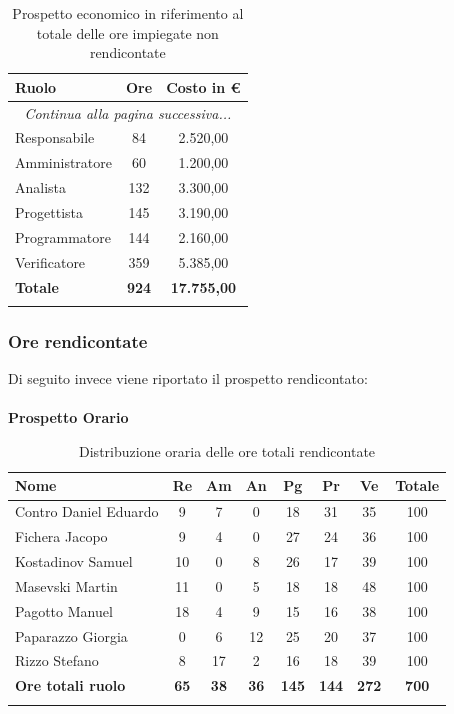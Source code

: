 \documentclass[../piano_di_progetto.tex]{subfiles}
\begin{document}
\begin{center}
	\begin{longtable}{|l|c|c|}
		\hline
		\rowcolor{lightgray}
		\textbf{Ruolo} & \textbf{Ore} & \textbf{Costo in €}\\
		\hline
		\endhead
		
		\hline
		\multicolumn{3}{|c|}{\emph{Continua alla pagina successiva...}}\\
		\hline
		\endfoot

		\endlastfoot
		
		Responsabile &  84  & 2.520,00\\
		Amministratore &  60  & 1.200,00\\
		Analista &  132  & 3.300,00 \\
		Progettista  & 145 & 3.190,00\\
		Programmatore  & 144 & 2.160,00\\
		Verificatore  & 359 & 5.385,00\\
		\hline
		\textbf{Totale} & \textbf{924} & \textbf{17.755,00}\\
		\hline
		\rowcolor{white}
		\caption{Prospetto economico in riferimento al totale delle ore impiegate non rendicontate}
	\end{longtable}
\end{center}

\subsubsection{Ore rendicontate}
Di seguito invece viene riportato il prospetto rendicontato:\\ \\
\textbf{Prospetto Orario}

\begin{center}
	\begin{longtable}{|l|c|c|c|c|c|c|c|}
		\hline
		\rowcolor{lightgray}
		\textbf{Nome} & \textbf{Re} & \textbf{Am} & \textbf{An} & \textbf{Pg}  & \textbf{Pr}   & \textbf{Ve} & \textbf{Totale} \\

		\hline
			Contro Daniel Eduardo & 9 & 7 & 0 & 18 & 31 & 35 & 100 \\
			Fichera Jacopo & 9 & 4 & 0 & 27 & 24 & 36 & 100 \\
			Kostadinov Samuel & 10 & 0 & 8 & 26 & 17 & 39 & 100 \\		
			Masevski Martin & 11 & 0 & 5 & 18 & 18 & 48 & 100 \\
			Pagotto Manuel & 18 & 4 & 9 & 15 & 16 & 38 & 100 \\			
			Paparazzo Giorgia & 0 & 6 & 12 & 25 & 20 & 37 & 100 \\
			Rizzo Stefano & 8 & 17 & 2 & 16 & 18 & 39 & 100 \\
			\hline
			\textbf{Ore totali ruolo} & \textbf{65} & \textbf{38} & \textbf{36} & \textbf{145} & \textbf{144} & \textbf{272} & \textbf{700} \\
		\hline	
		\rowcolor{white}
		\caption{Distribuzione oraria delle ore totali rendicontate}
	\end{longtable}
\end{center}
\end{document}
